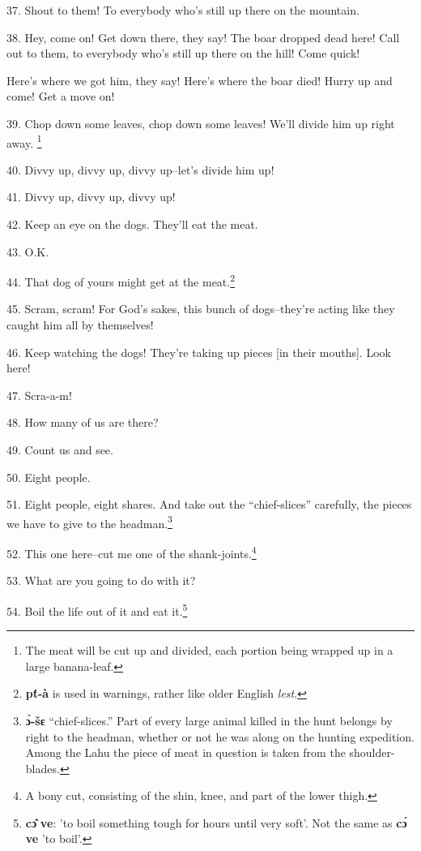 37. Shout to them! To everybody who's still up there on the mountain.

38. Hey, come on! Get down there, they say! The boar dropped dead here! Call out
to them, to everybody who's still up there on the hill! Come quick!

Here's where we got him, they say! Here's where the boar died! Hurry up and come!
Get a move on!

39. Chop down some leaves, chop down some leaves! We'll divide him up right away.
\footnote{The meat will be cut up and divided, each portion being wrapped up in a large banana-leaf.}

40. Divvy up, divvy up, divvy up--let's divide him up!

41. Divvy up, divvy up, divvy up!

42. Keep an eye on the dogs. They'll eat the meat.

43. O.K.


44. That dog of yours might get at the meat.\footnote{\textbf{pt́-à} is used in warnings, rather like older English \textit{lest}.}

45. Scram, scram! For God's sakes, this bunch of dogs--they're acting like they
caught him all by themselves!

46. Keep watching the dogs! They're taking up pieces [in their mouths]. Look here!

47. Scra-a-m!

48. How many of us are there?

49. Count us and see.

50. Eight people.

51. Eight people, eight shares. And take out the ``chief-slices''
carefully, the pieces we have to give to the headman.\footnote{\textbf{ɔ̀-šɛ} ``chief-slices.'' Part of every large animal killed in the hunt belongs by right to the headman, whether or not he was along on the hunting expedition. Among the Lahu the piece of meat in question is taken from the shoulder-blades.}

52. This one here--cut me one of the shank-joints.\footnote{A bony cut, consisting of the shin, knee, and part of the lower thigh.}

53. What are you going to do with it?

54. Boil the life out of it and eat it.\footnote{\textbf{cɔ̂} \textbf{ve}: 'to boil something tough for hours until very soft'. Not the same as \textbf{cɔ́} \textbf{ve} 'to boil'.}

